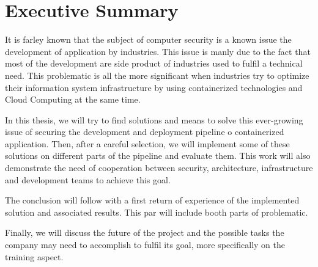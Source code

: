 \chapter*{Executive Summary}
It is farley known that the subject of computer security is a known issue the development of application by industries.
This issue is manly due to the fact that most of the development are side product of industries used to fulfil a 
technical need.
\newline This problematic is all the more significant when industries try to optimize their information system 
infrastructure by using containerized technologies and Cloud Computing at the same time.

In this thesis, we will try to find solutions and means to solve this ever-growing issue of securing the development and
deployment pipeline o containerized application. Then, after a careful selection, we will implement some of these solutions
on different parts of the pipeline and evaluate them.
\newline This work will also demonstrate the need of cooperation between security, architecture, infrastructure and 
development teams to achieve this goal.

The conclusion will follow with a first return of experience  of the implemented solution and associated results.
This par will include booth parts of  problematic.

Finally, we will discuss the future of the project and the possible tasks the company may need to accomplish to fulfil
its goal, more specifically on the training aspect.